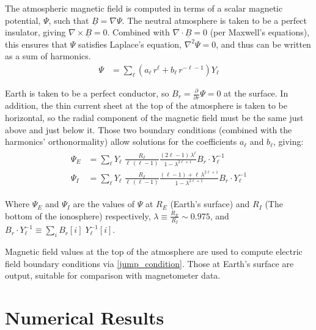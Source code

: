 \documentclass{article}
\renewcommand{\vec}[1]{\ensuremath{\underline{#1}}}
\newcommand{\dd}[1]{\ensuremath{ \frac{\partial}{\partial #1} }\xspace}
\newcommand{\curl}[1]{\ensuremath{ \nabla \times \vec{#1} }\xspace}
\renewcommand{\div}[1]{\ensuremath{ \nabla \cdot \vec{#1} }\xspace}
\newcommand{\grad}[1]{\ensuremath{ \nabla #1 }\xspace}
\newcommand{\lr}[1]{ \left( #1 \right) }
\begin{document}
The atmospheric magnetic field is computed in terms of a scalar magnetic potential, $\Psi$, such that $\vec{B}=\grad{\Psi}$. The neutral atmosphere is taken to be a perfect insulator, giving $\curl{B}=0$. Combined with $\div{B}=0$ (per Maxwell's equations), this ensures that $\Psi$ satisfies Laplace's equation, $\nabla^2 \Psi = 0$, and thus can be written as a sum of harmonics\cite{jackson_1999}.
\begin{align}
  \label{psi_expansion}
  \Psi &= \displaystyle\sum_\ell \lr{ a_\ell \, r^\ell +
    b_\ell \, r^{-\ell - 1} } Y_\ell
\end{align}

Earth is taken to be a perfect conductor, so $B_r = \dd{r} \Psi = 0$ at the surface. In addition, the thin current sheet at the top of the atmosphere is taken to be horizontal, so the radial component of the magnetic field must be the same just above and just below it. Those two boundary conditions (combined with the harmonics' orthonormality) allow solutions for the coefficients $a_\ell$ and $b_\ell$, giving:
\begin{align}
  \label{psi_final}
  \begin{split}
  \Psi_E &= \displaystyle\sum_\ell Y_\ell \; \frac{R_I}{ \ell \, \lr{\ell - 1} } \frac{ \lr{2 \ell - 1} \, \lambda^\ell }{ 1 - \lambda^{2 \ell + 1} } B_r \cdot Y_\ell^{-1} \\
  \Psi_I &= \displaystyle\sum_\ell Y_\ell \; \frac{R_I}{ \ell \, \lr{\ell - 1} } \frac{ \lr{\ell - 1} + \ell \, \lambda^{2 \ell + 1} }{ 1 - \lambda^{2 \ell + 1} } B_r \cdot Y_\ell^{-1}
  \end{split}
\end{align}

Where $\Psi_E$ and $\Psi_I$ are the values of $\Psi$ at $R_E$ (Earth's surface) and $R_I$ (The bottom of the ionosphere) respectively, $\lambda \equiv \frac{R_E}{R_I} \sim \num{0.975}$, and $B_r \cdot Y_\ell^{-1} \equiv \displaystyle\sum_i B_r [i] \; Y_\ell^{-1} \! [i]$.

Magnetic field values at the top of the atmosphere are used to compute electric field boundary conditions via \cref{jump_condition}. Those at Earth's surface are output, suitable for comparison with magnetometer data.


\section{Numerical Results}
\end{document}
